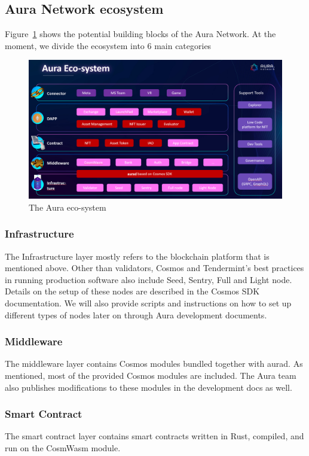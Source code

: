 \documentclass[12pt, titlepage]{article}
\begin{document}
\subsection{Aura Network ecosystem}
Figure~\ref{fig:auraeco} shows the potential building blocks of the Aura Network. At the moment, we divide the ecosystem into 6 main categories

\begin{figure}[ht]
\label{fig:auraeco}
\includegraphics[width=14cm]{img/auraeco.png}
\centering
\caption{The Aura eco-system}
\end{figure}

\subsubsection*{Infrastructure}
The Infrastructure layer mostly refers to the blockchain platform that is mentioned above. Other than validators, Cosmos and Tendermint's best practices in running production software also include Seed, Sentry, Full and Light node. Details on the setup of these nodes are described in the Cosmos SDK documentation. We will also provide scripts and instructions on how to set up different types of nodes later on through Aura development documents.

\subsubsection*{Middleware}
The middleware layer contains Cosmos modules bundled together with aurad. As mentioned, most of the provided Cosmos modules are included. The Aura team also publishes modifications to these modules in the development docs as well.

\subsubsection*{Smart Contract}
The smart contract layer contains smart contracts written in Rust, compiled, and run on the CosmWasm module.
\end{document}
